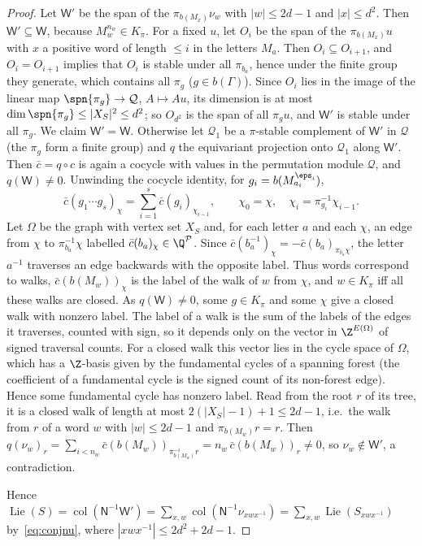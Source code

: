 \begin{proof}
Let $\mathsf W'$ be the span of the $\pi_{b(M_x)}\nu_w$ with $|w|\le2d-1$ and $|x|\le d^2$. Then
$\mathsf W'\subseteq\mathsf W$, because $M_w^{n_w}\in K_\pi$. For a fixed $u$, let $O_i$ be the span of the
$\pi_{b(M_x)}u$ with $x$ a positive word of length $\le i$ in the letters $M_a$. Then $O_i\subseteq O_{i+1}$,
and $O_i=O_{i+1}$ implies that $O_i$ is stable under all $\pi_{b_a}$, hence under the finite group they
generate, which contains all $\pi_g$ ($g\in b(\Gamma)$). Since $O_i$ lies in the image of the linear map
$\spn\{\pi_g\}\to\mathcal Q$, $A\mapsto Au$, its dimension is at most $\dim\spn\{\pi_g\}\le|X_S|^2\le d^2$;
so $O_{d^2}$ is the span of all $\pi_gu$, and $\mathsf W'$ is stable under all $\pi_g$. We claim
$\mathsf W'=\mathsf W$. Otherwise let $\mathcal Q_1$ be a $\pi$-stable complement of $\mathsf W'$ in $\mathcal Q$
(the $\pi_g$ form a finite group) and $q$ the equivariant projection onto $\mathcal Q_1$ along $\mathsf W'$.
Then $\bar c=q\circ c$ is again a cocycle with values in the permutation module $\mathcal Q$, and
$q(\mathsf W)\ne0$. Unwinding the cocycle identity,
for $g_i=b(M_{a_i}^{\eps_i})$,
\[
\bar c(g_1\cdots g_s)_\chi=\sum_{i=1}^s\bar c(g_i)_{\chi_{i-1}},\qquad\chi_0=\chi,\quad
\chi_i=\pi_{g_i}^{-1}\chi_{i-1}.
\]
Let $\Omega$ be the graph with vertex set $X_S$ and, for each letter $a$ and each $\chi$, an edge from
$\chi$ to $\pi_{b_a}^{-1}\chi$ labelled $\bar c(b_a)_\chi\in\Q^{\mathcal P}$. Since
$\bar c(b_a^{-1})_\chi=-\bar c(b_a)_{\pi_{b_a}\chi}$, the letter $a^{-1}$ traverses an edge backwards
with the opposite label. Thus words correspond to walks, $\bar c(b(M_w))_\chi$ is the label of the walk
of $w$ from $\chi$, and $w\in K_\pi$ iff all these walks are closed. As $q(\mathsf W)\ne0$, some $g\in K_\pi$
and some $\chi$ give a closed walk with nonzero label. The label of a walk is the sum of the labels of the
edges it traverses, counted with sign, so it depends only on the vector in $\Z^{E(\Omega)}$ of signed
traversal counts. For a closed walk this vector lies in the cycle space of $\Omega$, which has a
$\Z$-basis given by the fundamental cycles of a spanning forest (the coefficient of a fundamental cycle
is the signed count of its non-forest edge). Hence some fundamental cycle has nonzero label. Read from the root $r$ of its tree, it is a closed walk of length at most $2(|X_S|-1)+1\le2d-1$,
i.e.\ the walk from $r$ of a word $w$ with $|w|\le2d-1$ and $\pi_{b(M_w)}r=r$. Then
$q(\nu_w)_r=\sum_{i<n_w}\bar c(b(M_w))_{\pi^{-i}_{b(M_w)}r}=n_w\,\bar c(b(M_w))_r\ne0$, so
$\nu_w\notin\mathsf W'$, a contradiction.

Hence $\operatorname{Lie}(S)=\operatorname{col}(\mathsf N^{-1}\mathsf W')=\sum_{x,w}\operatorname{col}(\mathsf N^{-1}\nu_{xwx^{-1}})
=\sum_{x,w}\operatorname{Lie}(S_{xwx^{-1}})$ by~\eqref{eq:conjnu}, where $|xwx^{-1}|\le2d^2+2d-1$.
\end{proof}


